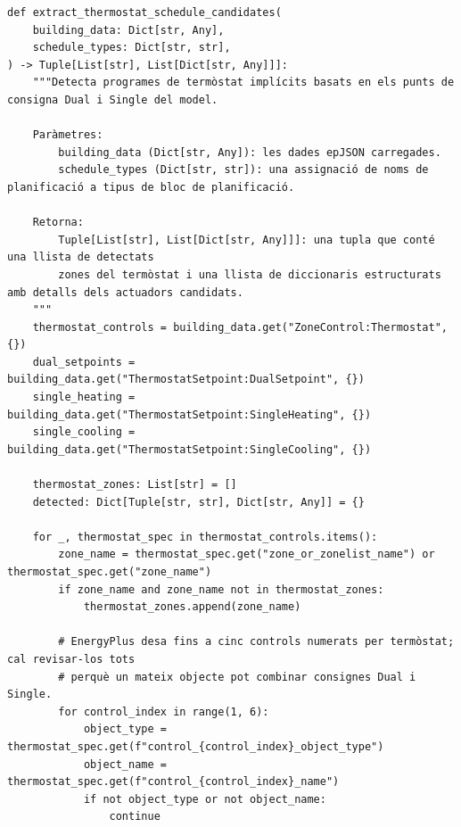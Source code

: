 \documentclass[10pt,a4paper]{article}
\begin{document}
\begin{lstlisting}[style=studioPython,caption={backend/afegir\_entorn\_analysis.py},label={lst:backend-afegir-entorn-analysis-py}]
def extract_thermostat_schedule_candidates(
    building_data: Dict[str, Any],
    schedule_types: Dict[str, str],
) -> Tuple[List[str], List[Dict[str, Any]]]:
    """Detecta programes de termòstat implícits basats en els punts de consigna Dual i Single del model.

    Paràmetres:
        building_data (Dict[str, Any]): les dades epJSON carregades.
        schedule_types (Dict[str, str]): una assignació de noms de planificació a tipus de bloc de planificació.

    Retorna:
        Tuple[List[str], List[Dict[str, Any]]]: una tupla que conté una llista de detectats
        zones del termòstat i una llista de diccionaris estructurats amb detalls dels actuadors candidats.
    """
    thermostat_controls = building_data.get("ZoneControl:Thermostat", {})
    dual_setpoints = building_data.get("ThermostatSetpoint:DualSetpoint", {})
    single_heating = building_data.get("ThermostatSetpoint:SingleHeating", {})
    single_cooling = building_data.get("ThermostatSetpoint:SingleCooling", {})

    thermostat_zones: List[str] = []
    detected: Dict[Tuple[str, str], Dict[str, Any]] = {}

    for _, thermostat_spec in thermostat_controls.items():
        zone_name = thermostat_spec.get("zone_or_zonelist_name") or thermostat_spec.get("zone_name")
        if zone_name and zone_name not in thermostat_zones:
            thermostat_zones.append(zone_name)

        # EnergyPlus desa fins a cinc controls numerats per termòstat; cal revisar-los tots
        # perquè un mateix objecte pot combinar consignes Dual i Single.
        for control_index in range(1, 6):
            object_type = thermostat_spec.get(f"control_{control_index}_object_type")
            object_name = thermostat_spec.get(f"control_{control_index}_name")
            if not object_type or not object_name:
                continue


\end{lstlisting}
\end{document}
